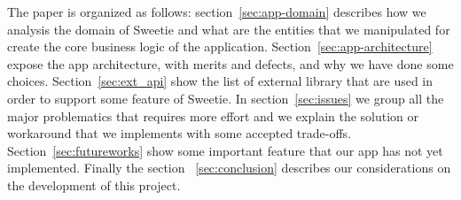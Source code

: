 The paper is organized as follows: section~\ref{sec:app-domain} describes how we analysis the domain of Sweetie and what are the entities that we manipulated for create the core business logic of the application. Section~\ref{sec:app-architecture} expose the app architecture, with merits and defects, and why we have done some choices. Section~\ref{sec:ext_api} show the list of external library that are used in order to support some feature of Sweetie. In section~\ref{sec:issues} we group all the major problematics that requires more effort and we explain the solution or workaround that we implements with some accepted trade-offs. Section~\ref{sec:futureworks}  show some important feature that our app has not yet implemented. Finally the section ~\ref{sec:conclusion} describes our considerations on the development of this project.
